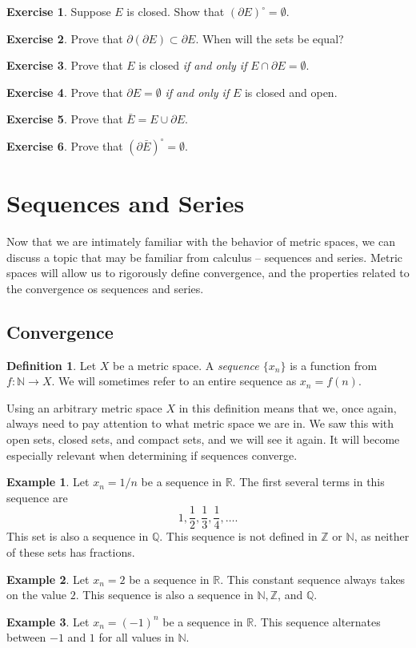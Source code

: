 \documentclass{article}
\newcommand{\N}{\mathbb{N}}
\newcommand{\R}{\mathbb{R}}
\newcommand{\Q}{\mathbb{Q}}
\newcommand{\Z}{\mathbb{Z}}
\theoremstyle{definition}
\newtheorem{definition}{Definition}[section]
\newtheorem{ex}{Exercise}[section]
\newtheorem{example}{Example}[section]
\begin{document}
\begin{ex}
	Suppose $ E $ is closed. Show that $ (\partial E)^\circ=\emptyset $. 
\end{ex}
\begin{ex}
	Prove that $ \partial (\partial E)\subset \partial E $. When will the sets be equal? 
\end{ex}
\begin{ex}
	Prove that $ E $ is closed \textit{if and only if} $ E\cap \partial E=\emptyset $.
\end{ex}
\begin{ex}
	Prove that $ \partial E=\emptyset$ \textit{if and only if} $ E $ is closed and open.  
\end{ex}
\begin{ex}
	Prove that $ \bar{E}=E\cup\partial E $.
\end{ex}
\begin{ex}
	Prove that $ (\partial \bar{E})^\circ=\emptyset $. 
\end{ex}
\newpage
\section{Sequences and Series}
Now that we are intimately familiar with the behavior of metric spaces, we can discuss a topic that may be familiar from calculus -- sequences and series. Metric spaces will allow us to rigorously define convergence, and the properties related to the convergence os sequences and series.    
\subsection{Convergence}
\begin{definition}
	Let $ X $ be a metric space. A \textit{\color{red}sequence $ \{x_n\} $} is a function from $ f:\N\to X $. We will sometimes refer to an entire sequence as $  x_n=f(n)$. 
\end{definition}
Using an arbitrary metric space $ X $ in this definition means that we, once again, always need to pay attention to what metric space we are in. We saw this with open sets, closed sets, and compact sets, and we will see it again. It will become especially relevant when determining if sequences converge. 
\begin{example}
	Let $ x_n=1/n$ be a sequence in $ \R $. The first several terms in this sequence are $$ 1,\frac{1}{2},\frac{1}{3},\frac{1}{4},\ldots.$$
	This set is also a sequence in $ \Q $. This sequence is not defined in $ \Z $ or $ \N $, as neither of these sets has fractions.  
\end{example}
\begin{example}
 Let $ x_n=2 $ be a sequence in $ \R $. This constant sequence always takes on the value $ 2$. This sequence is also a sequence in $ \N,\Z $, and $ \Q $.
\end{example}
\begin{example}
Let $ x_n=(-1)^n $ be a sequence in $ \R $. This sequence alternates between $ -1 $ and $ 1 $ for all values in $ \N $.  
\end{example}
\end{document}
